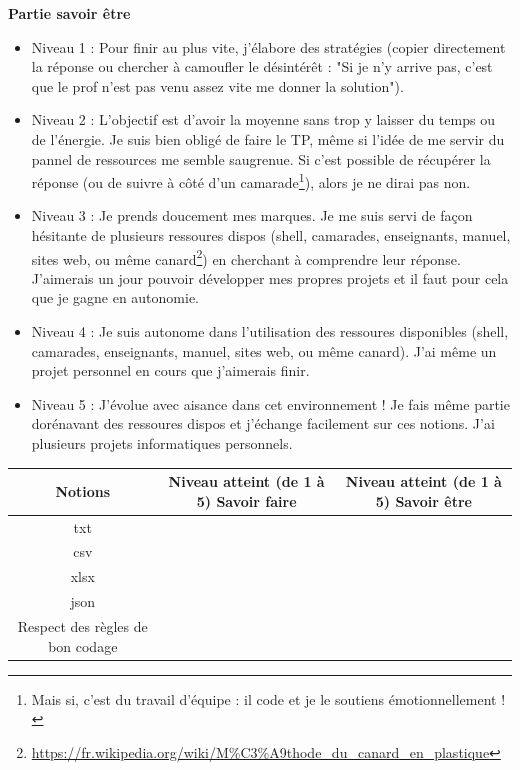 \textbf{Partie savoir être}
\begin{itemize}
    \item Niveau 1 :  Pour finir au plus vite, j'élabore des stratégies (copier directement la réponse ou chercher à camoufler le désintérêt : "Si je n'y arrive pas, c'est que le prof n'est pas venu assez vite me donner la solution"). 
    \item Niveau 2 : L'objectif est d'avoir la moyenne sans trop y laisser du temps ou de l'énergie. Je suis bien obligé de faire le TP, même si l'idée de me servir du pannel de ressources me semble saugrenue. Si c'est possible de récupérer la réponse (ou de suivre à côté d'un camarade\footnote{Mais si, c'est du travail d'équipe : il code et je le soutiens émotionnellement !}), alors je ne dirai pas non. 
    \item Niveau 3 : Je prends doucement mes marques. Je me suis servi de façon hésitante de plusieurs ressoures dispos (shell, camarades, enseignants, manuel, sites web, ou même canard\footnote{\url{https://fr.wikipedia.org/wiki/M\%C3\%A9thode_du_canard_en_plastique}}) en cherchant à comprendre leur réponse. J'aimerais un jour pouvoir développer  mes propres projets et il faut pour cela que je gagne en autonomie.
    \item Niveau 4 :   Je suis autonome dans l'utilisation des ressoures disponibles (shell, camarades, enseignants, manuel, sites web, ou même canard\footnotemark[7]). J'ai même un projet personnel en cours que j'aimerais finir.
    \item Niveau 5 : J'évolue avec aisance dans cet environnement ! Je  fais même partie dorénavant des ressoures dispos et  j'échange facilement sur ces notions. J'ai plusieurs projets informatiques personnels. 
\end{itemize}

\begin{table}[H]
    \centering
    \begin{tabular}{|c|c|c|} \hline
        \textbf{Notions} & \textbf{Niveau atteint} (de 1 à 5) \textbf{Savoir faire}  & \textbf{Niveau atteint} (de 1 à 5) \textbf{Savoir être}\\\hline
        txt & & \\\hline
        csv &&\\\hline
        xlsx &&\\\hline
        json &&\\\hline
        Respect des règles de bon codage && \\\hline
    \end{tabular}
\end{table}


